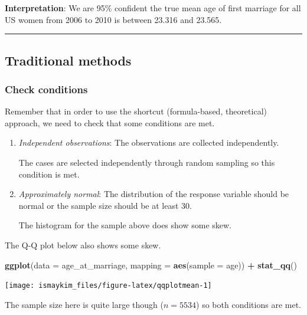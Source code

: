 \documentclass[12pt,]{krantz}
\makeatletter
\newenvironment{Shaded}{\begin{snugshade}}{\end{snugshade}}
\newcommand{\KeywordTok}[1]{\textcolor[rgb]{0.27,0.27,0.27}{\textbf{#1}}}
\newcommand{\DataTypeTok}[1]{\textcolor[rgb]{0.27,0.27,0.27}{#1}}
\newcommand{\StringTok}[1]{\textcolor[rgb]{0.5,0.5,0.5}{#1}}
\newcommand{\OperatorTok}[1]{\textcolor[rgb]{0.43,0.43,0.43}{\textbf{#1}}}
\newcommand{\NormalTok}[1]{#1}
\newenvironment{kframe}{%
\medskip{}
\setlength{\fboxsep}{.8em}
 \def\at@end@of@kframe{}%
 \ifinner\ifhmode%
  \def\at@end@of@kframe{\end{minipage}}%
  \begin{minipage}{\columnwidth}%
 \fi\fi%
 \def\FrameCommand##1{\hskip\@totalleftmargin \hskip-\fboxsep
 \colorbox{shadecolor}{##1}\hskip-\fboxsep
     \hskip-\linewidth \hskip-\@totalleftmargin \hskip\columnwidth}%
 \MakeFramed {\advance\hsize-\width
   \@totalleftmargin\z@ \linewidth\hsize
   \@setminipage}}%
 {\par\unskip\endMakeFramed%
 \at@end@of@kframe}
\renewenvironment{Shaded}{\begin{kframe}}{\end{kframe}}
\theoremstyle{definition}
\theoremstyle{definition}
\theoremstyle{definition}
\theoremstyle{remark}
\makeatother
\begin{document}
\textbf{Interpretation}: We are 95\% confident the true mean age of
first marriage for all US women from 2006 to 2010 is between 23.316 and
23.565.

\begin{center}\rule{0.5\linewidth}{\linethickness}\end{center}

\subsection{Traditional methods}\label{traditional-methods}

\subsubsection*{Check conditions}\label{check-conditions}


Remember that in order to use the shortcut (formula-based, theoretical)
approach, we need to check that some conditions are met.

\begin{enumerate}
\def\labelenumi{\arabic{enumi}.}
\item
  \emph{Independent observations}: The observations are collected
  independently.

  The cases are selected independently through random sampling so this
  condition is met.
\item
  \emph{Approximately normal}: The distribution of the response variable
  should be normal or the sample size should be at least 30.

  The histogram for the sample above does show some skew.
\end{enumerate}

The Q-Q plot below also shows some skew.

\begin{Shaded}
\begin{Highlighting}[]
\KeywordTok{ggplot}\NormalTok{(}\DataTypeTok{data =}\NormalTok{ age_at_marriage, }\DataTypeTok{mapping =} \KeywordTok{aes}\NormalTok{(}\DataTypeTok{sample =}\NormalTok{ age)) }\OperatorTok{+}
\StringTok{  }\KeywordTok{stat_qq}\NormalTok{()}
\end{Highlighting}
\end{Shaded}

\begin{center}\texttt{[image: ismaykim\_files/figure-latex/qqplotmean-1]} \end{center}

The sample size here is quite large though (\(n = 5534\)) so both
conditions are met.
\end{document}
